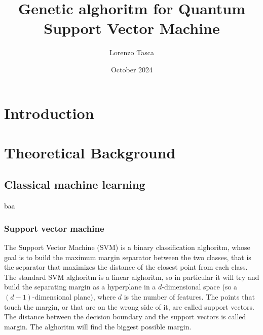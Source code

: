 \documentclass[a4paper]{article}
\title{Genetic alghoritm for Quantum Support Vector Machine}
\author{Lorenzo Tasca}
\date{October 2024}
\begin{document}
\maketitle
\tableofcontents

\newpage


\section{Introduction}


\section{Theoretical Background}

\subsection{Classical machine learning}
baa
\subsubsection{Support vector machine}



The Support Vector Machine (SVM) is a binary classification alghoritm, whose goal is to build the maximum margin separator between the two classes, that is the separator that maximizes the distance of the closest point from each class. The standard SVM alghoritm is a linear alghoritm, so in particular it will try and build the separating margin as a hyperplane in a $d$-dimensional space (so a $(d-1)$-dimensional plane), where $d$ is the number of features. The points that touch the margin, or that are on the wrong side of it, are called support vectors. The distance between the decision boundary and the support vectors is called margin. The alghoritm will find the biggest possible margin. 
\end{document}
